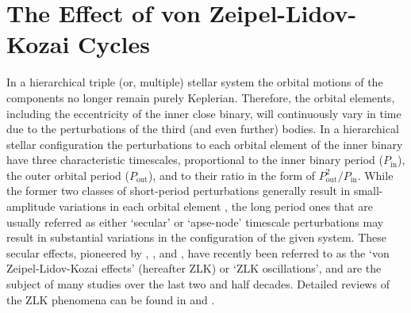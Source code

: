 \documentclass[fleqn,usenatbib]{mnras} %
\begin{document}
\section{The Effect of von Zeipel-Lidov-Kozai Cycles}
\label{sec:KL}
In a hierarchical triple (or, multiple) stellar system the orbital motions of the components no longer remain purely Keplerian. Therefore, the orbital elements, including the eccentricity of the inner close binary, will continuously vary in time due to the perturbations of the third (and even further) bodies. In a hierarchical stellar configuration the perturbations to each orbital element of the inner binary have three characteristic timescales, proportional to the inner binary period ($P_\mathrm{in}$), the outer orbital period ($P_\mathrm{out}$), and to their ratio in the form of $P_\mathrm{out}^2/P_\mathrm{in}$. While the former two classes of short-period perturbations generally result in small-amplitude variations in each orbital element \citep[see, e.g.][]{Borkovits2015}, the long period ones that are usually referred as either `secular' or `apse-node' timescale perturbations may result in substantial variations in the configuration of the given system.  These secular effects, pioneered by \citet{vonZeipel1910}, \citet{Lidov1962}, and \citet{Kozai1962}, have recently been referred to as the `von Zeipel-Lidov-Kozai effects' (hereafter ZLK) or `ZLK oscillations', and are the subject of many studies over the last two and half decades. Detailed reviews of the ZLK phenomena can be found in \citet{Naoz2016} and \citet{Ito2019}.
\end{document}

